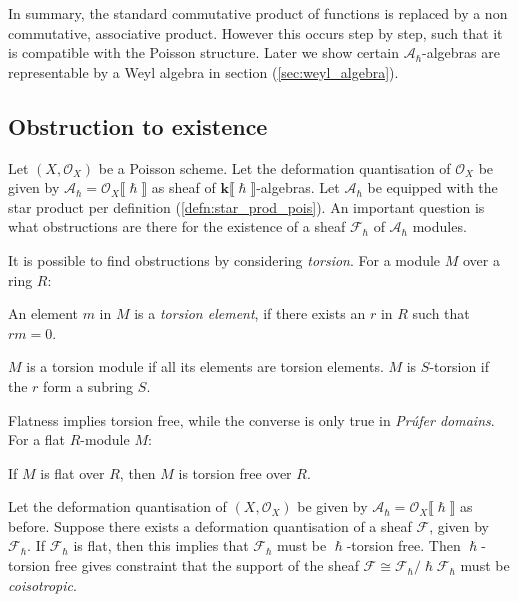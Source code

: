     


    In summary, the standard commutative product of functions is replaced by a non commutative, associative product. However this occurs step by step, such that it is compatible with the Poisson structure. Later we show certain \( \mathcal{A}_{\hslash}\)-algebras are representable by a Weyl algebra in section (\ref{sec:weyl_algebra}). 
    
    \subsection{Obstruction to existence}
    
    Let \((X,\mathcal{O}_X)\) be a Poisson scheme. Let the deformation quantisation of \(\mathcal{O}_X\) be given by \(\mathcal{A}_{\hslash} = \mathcal{O}_X\lBrack \hslash \rBrack\) as sheaf of \( \mathbf{k} \lBrack \hslash \rBrack\)-algebras. Let \( \mathcal{A}_{\hslash}\) be equipped with the star product per definition (\ref{defn:star_prod_pois}).  An important question is what obstructions are there for the existence of a sheaf \(\mathcal{F}_\hslash\) of \( \mathcal{A}_{\hslash}\) modules. 
    
    It is possible to find obstructions by considering \emph{torsion}. For a module \(M\) over a ring \(R\):
    \begin{defn} An element \(m\) in \(M\) is a \emph{torsion element}, if there exists an \(r \) in \(R\) such that \(rm=0\).
    \end{defn}
    \(M\) is a torsion module if all its elements are torsion elements. \(M\) is \(S\)-torsion if the \(r\) form a subring \(S\). 
    
    Flatness implies torsion free, while the converse is only true in \emph{Pr\'ufer domains}. For a flat \(R\)-module \(M\):
    \begin{lem}
    If \(M\) is flat over \(R\), then \(M\) is torsion free over \(R\).
    \end{lem}
    
    Let the deformation quantisation of \((X,\mathcal{O}_X)\) be given by \( \mathcal{A}_\hslash = \mathcal{O}_X \lBrack \hslash \rBrack \) as before. Suppose there exists a deformation quantisation of a sheaf \( \mathcal{F}\), given by \( \mathcal{F}_{\hslash}\).
    If \( \mathcal{F}_\hslash \) is flat, then this implies that \( \mathcal{F}_{\hslash}\) must be \( \hslash\)-torsion free. Then \(\hslash\)-torsion free gives constraint that the support of the sheaf \(\mathcal{F} \cong \mathcal{F}_{\hslash}/\hslash \mathcal{F}_{\hslash}\) must be \emph{coisotropic}.
   
